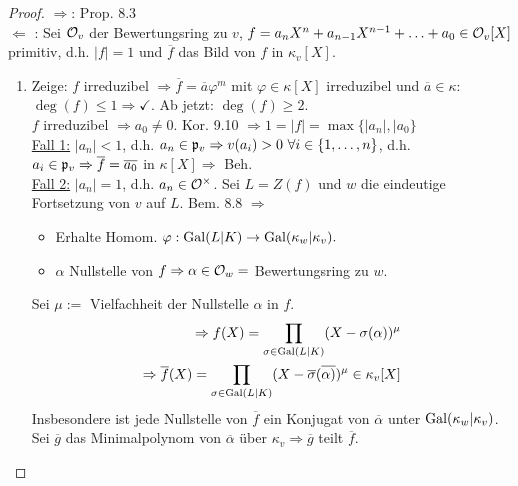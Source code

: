 
\begin{proof}
\glqq $\Rightarrow$\grqq: Prop. 8.3\\
\glqq $\Leftarrow$ \grqq: Sei $\mathcal{O}_v$ der Bewertungsring zu $v$, $f=a_nX^n+a_{n-1}X^{n-1}+ \ldots+a_0 \in \mathcal{O}_v[X]$ primitiv, d.h. $|f|=1$ und $\overline{f}$ das Bild von $f$ in $\kappa_v[X]$.
\begin{enumerate}[(1)]
\item Zeige: $f$ irreduzibel $\Rightarrow \overline{f}=\overline{a} \varphi^m$ mit $\varphi \in \kappa[X]$ irreduzibel und $\overline{a} \in \kappa$:\\
$\deg(f) \leq 1 \Rightarrow \checkmark$. Ab jetzt: $\deg(f) \geq 2$.\\
$f$ irreduzibel $\Rightarrow  a_0 \neq 0$. Kor. 9.10 $\Rightarrow 1=|f|=\max\{|a_n|, |a_0\}$\\
\underline{Fall 1:} $|a_n|<1$, d.h. $a_n \in \p_v \Rightarrow v(a_i)>0 \ \forall i \in \{1, \ldots, n\}$, d.h. $a_i \in \mathfrak{p}_v \Rightarrow \overline{f}= \overline{a_0}$ in $\kappa[X] \Rightarrow$ Beh.\\
\underline{Fall 2:} $|a_n|=1$, d.h. $a_n \in \mathcal{O}^\times$. Sei $L=Z(f)$ und $w$ die eindeutige Fortsetzung von $v$ auf $L$. Bem. 8.8 $\Rightarrow$
\begin{itemize}
\item Erhalte Homom. $\varphi: \operatorname{Gal}(L|K) \to \operatorname{Gal}(\kappa_w|\kappa_v).$
\item $\alpha$ Nullstelle von $f \Rightarrow \alpha \in \mathcal{O}_w=$ Bewertungsring zu $w$.
\end{itemize}
Sei $\mu:=$ Vielfachheit der Nullstelle $\alpha$ in $f$.
\begin{align*}
\Rightarrow f(X)=\prod_{\sigma\in \operatorname{Gal}(L|K)} (X-\sigma(\alpha))^\mu\\
\Rightarrow \overline{f}(X)=\prod_{\sigma\in \operatorname{Gal}(L|K)} (X-\overline{\sigma}(\overline{\alpha)})^\mu \in \kappa_v[X]\\
\end{align*}
Insbesondere ist jede Nullstelle von $\overline{f}$ ein Konjugat von $\overline{\alpha}$ unter $\operatorname{Gal}(\kappa_w|\kappa_v)$. Sei $\overline{g}$ das Minimalpolynom von $\overline{\alpha}$ über $\kappa_v \Rightarrow \overline{g}$ teilt $\overline{f}$.


\end{enumerate}
\end{proof}
